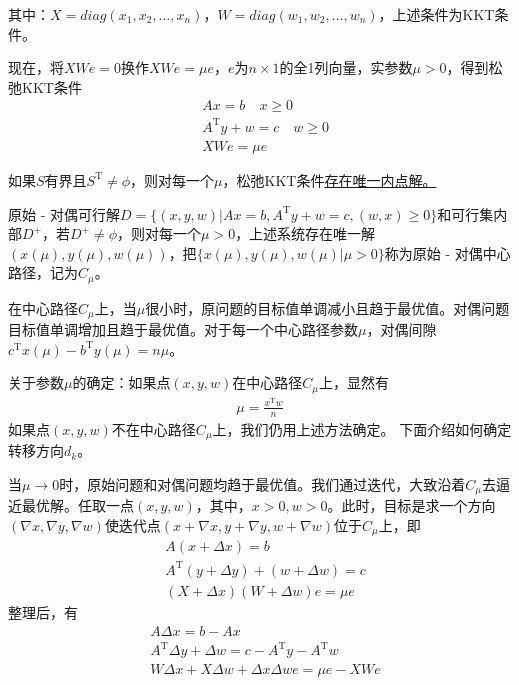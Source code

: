         其中：$X=diag(x_1,x_2,\ldots,x_n)$，$W=diag(w_1,w_2,\ldots,w_n)$，上述条件为KKT条件。
        \par
        现在，将$XWe=0$换作$XWe=\mu e$，$e$为$n \times 1$的全1列向量，实参数$\mu > 0$，得到松弛KKT条件
        \begin{align*}
        &Ax=b \quad x\geqslant 0\\
        &A^\mathrm{T} y+w=c \quad w \geqslant 0\\
        &XWe = \mu e
        \end{align*}
        \par
        如果$S$有界且$S^\mathrm{T}  \neq \phi$，则对每一个$\mu $，松弛KKT条件\underline{存在唯一内点解。}
        \begin{definition}[原始 - 对偶中心路径]
        原始 - 对偶可行解$D=\{(x,y,w)|Ax=b,A^\mathrm{T} y+w=c,(w,x) \geqslant 0\}$和可行集内部$D^+$，若$D^+ \neq \phi$，则对每一个$\mu > 0$，上述系统存在唯一解$\left(x(\mu),y(\mu),w(\mu)\right)$，把$\{x(\mu),y(\mu),w(\mu)|\mu > 0\}$称为原始 - 对偶中心路径，记为$C_{\mu}$。
        \end{definition}
        \par
        在中心路径$C_{\mu}$上，当$\mu$很小时，原问题的目标值单调减小且趋于最优值。对偶问题目标值单调增加且趋于最优值。对于每一个中心路径参数$\mu$，对偶间隙$c^\mathrm{T} x(\mu)-b^\mathrm{T} y(\mu)=n\mu$。
        \par
        关于参数$\mu$的确定：如果点$(x,y,w)$在中心路径$C_{\mu}$上，显然有
        \begin{align*}
        \mu = \frac{x^\mathrm{T} w}{n}
        \end{align*}
        如果点$(x,y,w)$不在中心路径$C_{\mu}$上，我们仍用上述方法确定。
        下面介绍如何确定转移方向$d_k$。
        \par
        当$\mu \to 0$时，原始问题和对偶问题均趋于最优值。我们通过迭代，大致沿着$C_{\mu}$去逼近最优解。任取一点$(x,y,w)$，其中，$x>0,w>0$。此时，目标是求一个方向$(\nabla x,\nabla y,\nabla w)$使迭代点$(x+\nabla x,y+\nabla y,w+\nabla w)$位于$C_{\mu}$上，即
        \begin{align*}
        &A(x+\Delta x)=b \\
        &A^\mathrm{T} (y+\Delta y)+(w+\Delta w)=c \\
        &(X+\Delta x)(W+\Delta w)e = \mu e
        \end{align*}
        整理后，有
        \begin{align*}
        &A\Delta x=b-Ax \\
        &A^\mathrm{T} \Delta y+\Delta w=c-A^\mathrm{T} y- A^\mathrm{T} w\\
        &W\Delta x+X\Delta w+\Delta x \Delta w e = \mu e-XWe
        \end{align*}
